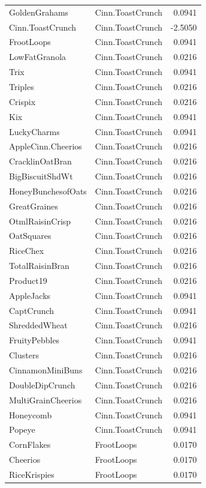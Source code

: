 \begin{longtable}{llr}
GoldenGrahams & Cinn.ToastCrunch & 0.0941 \\
Cinn.ToastCrunch & Cinn.ToastCrunch & -2.5050 \\
FrootLoops & Cinn.ToastCrunch & 0.0941 \\
LowFatGranola & Cinn.ToastCrunch & 0.0216 \\
Trix & Cinn.ToastCrunch & 0.0941 \\
Triples & Cinn.ToastCrunch & 0.0216 \\
Crispix & Cinn.ToastCrunch & 0.0216 \\
Kix & Cinn.ToastCrunch & 0.0941 \\
LuckyCharms & Cinn.ToastCrunch & 0.0941 \\
AppleCinn.Cheerios & Cinn.ToastCrunch & 0.0216 \\
CracklinOatBran & Cinn.ToastCrunch & 0.0216 \\
BigBiscuitShdWt & Cinn.ToastCrunch & 0.0216 \\
HoneyBunchesofOats & Cinn.ToastCrunch & 0.0216 \\
GreatGraines & Cinn.ToastCrunch & 0.0216 \\
OtmlRaisinCrisp & Cinn.ToastCrunch & 0.0216 \\
OatSquares & Cinn.ToastCrunch & 0.0216 \\
RiceChex & Cinn.ToastCrunch & 0.0216 \\
TotalRaisinBran & Cinn.ToastCrunch & 0.0216 \\
Product19 & Cinn.ToastCrunch & 0.0216 \\
AppleJacks & Cinn.ToastCrunch & 0.0941 \\
CaptCrunch & Cinn.ToastCrunch & 0.0941 \\
ShreddedWheat & Cinn.ToastCrunch & 0.0216 \\
FruityPebbles & Cinn.ToastCrunch & 0.0941 \\
Clusters & Cinn.ToastCrunch & 0.0216 \\
CinnamonMiniBuns & Cinn.ToastCrunch & 0.0216 \\
DoubleDipCrunch & Cinn.ToastCrunch & 0.0216 \\
MultiGrainCheerios & Cinn.ToastCrunch & 0.0216 \\
Honeycomb & Cinn.ToastCrunch & 0.0941 \\
Popeye & Cinn.ToastCrunch & 0.0941 \\
CornFlakes & FrootLoops & 0.0170 \\
Cheerios & FrootLoops & 0.0170 \\
RiceKrispies & FrootLoops & 0.0170 \\

\end{longtable}
